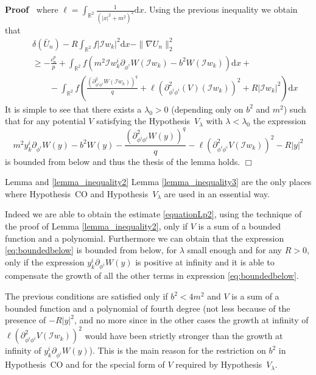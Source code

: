 \documentclass[a4paper,10pt]{article}
\newcommand{\mathd}{\mathrm{d}}
\newenvironment{proof}{\noindent\textbf{Proof\ }}{\hspace*{\fill}$\Box$\medskip}
\begin{document}
\begin{proof}
  where $\ell = \int_{\mathbb{R}^2} \frac{1}{(| x |^2 + m^2)^2} \mathd x$.
  Using the previous inequality we obtain that
  \begin{eqnarray}
    &  & \delta (\bar{U}_n) - R \int_{\mathbb{R}^2} f | \mathcal{I}w_k |^2
    \mathd x - \| \nabla U_n \|^2_2 \nonumber\\
    &  & \geqslant - \frac{c_n^p}{p} + \int_{\mathbb{R}^2} f (m^2
    \mathcal{I}w^i_k \partial_{\phi^i} W (\mathcal{I}w_k) - b^2 W
    (\mathcal{I}w_k)) \mathd x + \nonumber\\
    &  & \qquad - \int_{\mathbb{R}^2} f \left( \frac{(\partial_{\phi^i
    \phi^i}^2 W (\mathcal{I}w_k))^q}{q} + \ell (\partial_{\phi^i \phi^i}^2 (V)
    (\mathcal{I}w_k))^2 + R | \mathcal{I}w_k |^2 \right) \mathd x \nonumber
  \end{eqnarray}
  It is simple to see that there exists a $\lambda_0 > 0$ (depending only on
  $b^2$ and $m^2$) such that for any potential $V$ satisfying the
  Hypothesis~$V_{\lambda}$ with $\lambda < \lambda_0$ the expression
  \begin{equation}
    m^2 y^i_k \partial_{\phi^i} W (y) - b^2 W (y) - \frac{(\partial_{\phi^i
    \phi^i}^2 W (y))^q}{q} - \ell (\partial_{\phi^i \phi^i}^2 V
    (\mathcal{I}w_k))^2 - R | y |^2 \label{eq:boundedbelow}
  \end{equation}
  is bounded from below and thus the thesis of the lemma holds.
\end{proof}

\begin{remark}
  \label{remark_hypotheses}Lemma and \ref{lemma_inequality2} Lemma
  \ref{lemma_inequality3} are the only places where Hypothesis~CO and
  Hypothesis~$V_{\lambda}$ are used in an essential way.
  
  Indeed we are able to obtain the estimate {\eqref{equationLp2}}, using the
  technique of the proof of Lemma \ref{lemma_inequality2}, only if $V$ is a
  sum of a bounded function and a polynomial. Furthermore we can obtain that
  the expression {\eqref{eq:boundedbelow}} is bounded from below, for
  $\lambda$ small enough and for any $R > 0$, only if the expression $y^i_k
  \partial_{\phi^i} W (y)$ is positive at infinity and it is able to
  compensate the growth of all the other terms in expression
  {\eqref{eq:boundedbelow}}.
  
  The previous conditions are satisfied only if $b^2 < 4 m^2$ and $V$ is a sum
  of a bounded function and a polynomial of fourth degree (not less because of
  the presence of $- R | y |^2$, and no more since in the other cases the
  growth at infinity of $\ell (\partial_{\phi^i \phi^i}^2 V
  (\mathcal{I}w_k))^2$ would have been strictly stronger than the growth at
  infinity of $y^i_k \partial_{\phi^i} W (y)$). This is the main reason for
  the restriction on $b^2$ in Hypothesis~CO and for the special form of $V$
  required by Hypothesis~$V_{\lambda}$. \ 
\end{remark}
\end{document}
